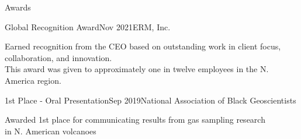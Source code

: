 \documentclass{resume} %
\begin{document}
\begin{rSection}{Awards}

\begin{rSubsection}{Global Recognition Award}{Nov 2021}{ERM, Inc.}{}
\item {Earned recognition from the CEO based on outstanding work in client focus, collaboration, and innovation. \\ This award was given to approximately one in twelve employees in the N. America region.}
\end{rSubsection}


\begin{rSubsection}{1st Place - Oral Presentation}{Sep 2019}{National Association of Black Geoscientists}{}
\item {Awarded 1st place for communicating results from gas sampling research \\ in N. American volcanoes}
\end{rSubsection}

\end{rSection}

\end{document}
